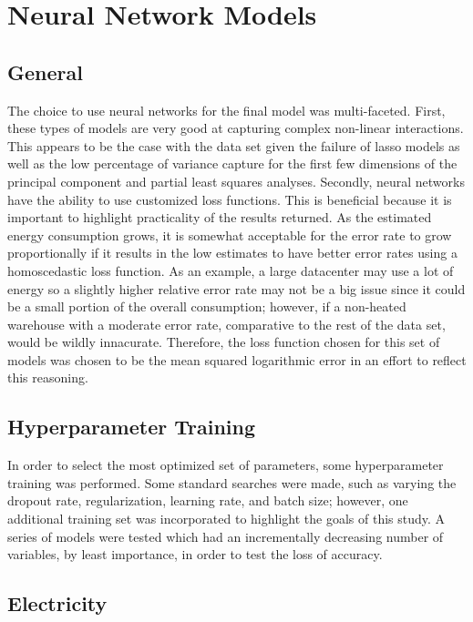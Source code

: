 \section*{Neural Network Models}
\label{sec:nn_models}

\subsection{General}
The choice to use neural networks for the final model was multi-faceted.  First, these types of models are very good at capturing complex non-linear interactions.  This appears to be the case with the data set given the failure of lasso models as well as the low percentage of variance capture for the first few dimensions of the principal component and partial least squares analyses.  Secondly, neural networks have the ability to use customized loss functions.  This is beneficial because it is important to highlight practicality of the results returned.  As the estimated energy consumption grows, it is somewhat acceptable for the error rate to grow proportionally if it results in the low estimates to have better error rates using a homoscedastic loss function.  As an example, a large datacenter may use a lot of energy so a slightly higher relative error rate may not be a big issue since it could be a small portion of the overall consumption; however, if a non-heated warehouse with a moderate error rate, comparative to the rest of the data set, would be wildly innacurate.  Therefore, the loss function chosen for this set of models was chosen to be the mean squared logarithmic error in an effort to reflect this reasoning.

\subsection{Hyperparameter Training}
In order to select the most optimized set of parameters, some hyperparameter training was performed.  Some standard searches were made, such as varying the dropout rate, regularization, learning rate, and batch size; however, one additional training set was incorporated to highlight the goals of this study.  A series of models were tested which had an incrementally decreasing number of variables, by least importance, in order to test the loss of accuracy.

\subsection{Electricity}

